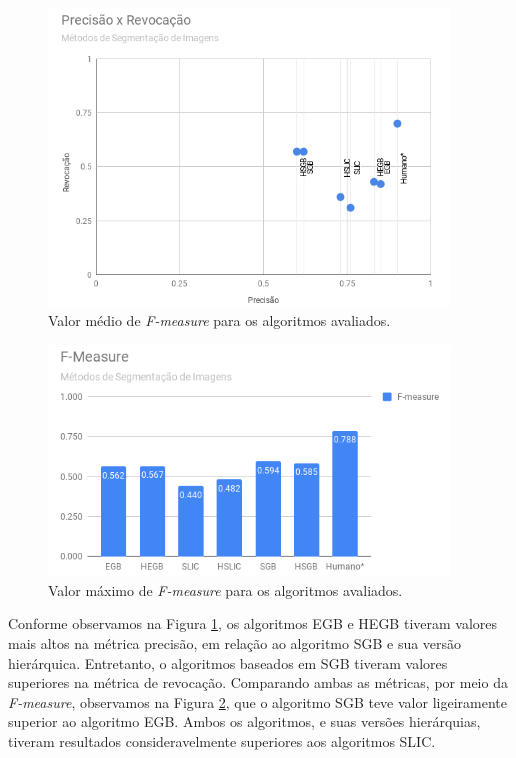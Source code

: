 \begin{document}
\begin{figure}[ht]
\centering
\includegraphics[width=0.95\textwidth]{graph_precision_recall.png}
\caption{Valor médio de \textit{F-measure} para os algoritmos avaliados.}
\label{gra:PREC_RECALL}
\end{figure}

\begin{figure}[ht]
\centering
\includegraphics[width=0.95\textwidth]{graph_fmeasure.png}
\caption{Valor máximo de \textit{F-measure} para os algoritmos avaliados.}
\label{gra:FMEASURE}
\end{figure}

Conforme observamos na Figura \ref{gra:PREC_RECALL}, os algoritmos EGB e HEGB tiveram valores mais altos na métrica precisão, em relação ao algoritmo SGB e sua versão hierárquica. Entretanto, o algoritmos baseados em SGB tiveram valores superiores na métrica de revocação. Comparando ambas as métricas, por meio da \textit{F-measure}, observamos na Figura \ref{gra:FMEASURE}, que o algoritmo SGB teve valor ligeiramente superior ao algoritmo EGB. Ambos os algoritmos, e suas versões hierárquias, tiveram resultados consideravelmente superiores aos algoritmos SLIC.
\end{document}

